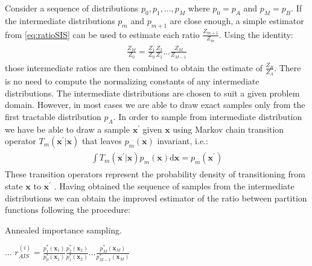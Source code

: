 Consider a sequence of distributions $p_0, p_1, ..., p_M$ where $p_0 = p_A$ and $p_M = p_B$. If the intermediate distributions $p_{m}$ and $p_{m+1}$ are close enough, a simple estimator from \ref{eq:ratioSIS} can be used to estimate each ratio $\frac{Z_{m+1}}{Z_m}$. Using the identity: 
\begin{align}
\begin{split}
\frac{Z_M}{Z_0} = \frac{Z_1}{Z_0}\frac{Z_2}{Z_1}... \frac{Z_M}{Z_{M-1}}
\end{split}
\end{align}
those intermediate ratios are then combined to obtain the estimate of $\frac{Z_B}{Z_A}$. There is no need to compute the normalizing constants of any intermediate distributions. The intermediate distributions are chosen to suit a given problem domain. However, in most cases we are able to draw exact samples only from the first tractable distribution $p_A$. In order to sample from intermediate distribution we have be able to draw a sample $\mathbf{x}^{'}$ given $\mathbf{x}$ using Markov chain transition operator $T_m(\mathbf{x}^{'} |\mathbf{x}) $ that leaves $p_m(\mathbf{x})$ invariant, i.e.:
 \begin{align}
\begin{split}
\int T_m(\mathbf{x}^{'} |\mathbf{x}) p_m(\mathbf{x})\text{d}\mathbf{x} = p_m(\mathbf{x}^{'})
\end{split}
\end{align}
These transition operators represent the probability density of transitioning from state $\mathbf{x}$ to $\mathbf{x}^{'}$ \cite{salakhutdinov2008learning}. Having obtained the sequence of samples from the intermediate distributions we can obtain the improved estimator of the ratio between partition functions following the procedure:
\begin{algorithm}[!bthp]
\caption{Annealed importance sampling.}
\label{alg:vae}
\begin{algorithmic}
\State ...
\State $r^{(i)}_{AIS} = \frac{ p^*_1(\mathbf{x}_1) }{ p^*_0(\mathbf{x}_1) }\frac{ p^*_2(\mathbf{x}_2) }{ p^*_1(\mathbf{x}_2) } ... \frac{ p^*_M(\mathbf{x}_M) }{ p^*_{M-1}
(\mathbf{x}_M) }$
\EndFor
\end{algorithmic}
\end{algorithm}

